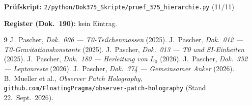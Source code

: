 \medskip
\noindent\textbf{Prüfskript:} \texttt{2/python/Dok375\_Skripte/pruef\_375\_hierarchie.py} (11/11)

\medskip
\noindent\textbf{Register (Dok.~190):} kein Eintrag.

\begin{thebibliography}{9}
 J.~Pascher, \emph{Dok.~006 --- T0-Teilchenmassen} (2025).
 J.~Pascher, \emph{Dok.~012 --- T0-Gravitationskonstante} (2025).
 J.~Pascher, \emph{Dok.~013 --- T0 und SI-Einheiten} (2025).
 J.~Pascher, \emph{Dok.~180 --- Herleitung von $L_0$} (2026).
 J.~Pascher, \emph{Dok.~352 --- Leptonreste} (2026).
 J.~Pascher, \emph{Dok.~374 --- Gemeinsamer Anker} (2026).
 B.~Mueller et al., \emph{Observer Patch Holography},
  \texttt{github.com/FloatingPragma/observer-patch-holography} (Stand 22.~Sept.~2026).
\end{thebibliography}
